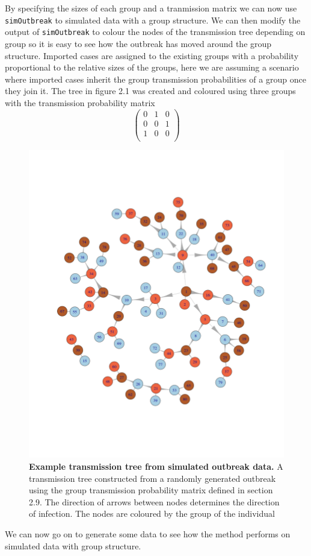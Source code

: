 \documentclass[11pt,a4paper]{report}
\begin{document}
By specifying the sizes of each group and a tranmission matrix we can now use {\tt simOutbreak} to simulated data with a group structure. We can then modify the output of {\tt simOutbreak} to colour the nodes of the transmission tree depending on group so it is easy to see how the outbreak has moved around the group structure. Imported cases are assigned to the existing groups with a probability proportional to the relative sizes of the groups, here we are assuming a scenario where imported cases inherit the group transmission probabilities of a group once they join it. The tree in figure 2.1 was created and coloured using three groups with the transmission probability matrix
\[ \left( \begin{array}{ccc}
0 & 1 & 0 \\
0 & 0 & 1 \\
1 & 0 & 0 \\
\end{array} \right) \]
\begin{figure}[h!]
\centering 
\includegraphics[scale=0.3]{treexample.png} \newline
\caption{{\bf Example transmission tree from simulated outbreak data.} A transmission tree constructed from a randomly generated outbreak using the group transmission probability matrix defined in section 2.9. The direction of arrows between nodes determines the direction of infection. The nodes are coloured by the group of the individual}
\end{figure}
We can now go on to generate some data to see how the method performs on simulated data with group structure.
\end{document}
